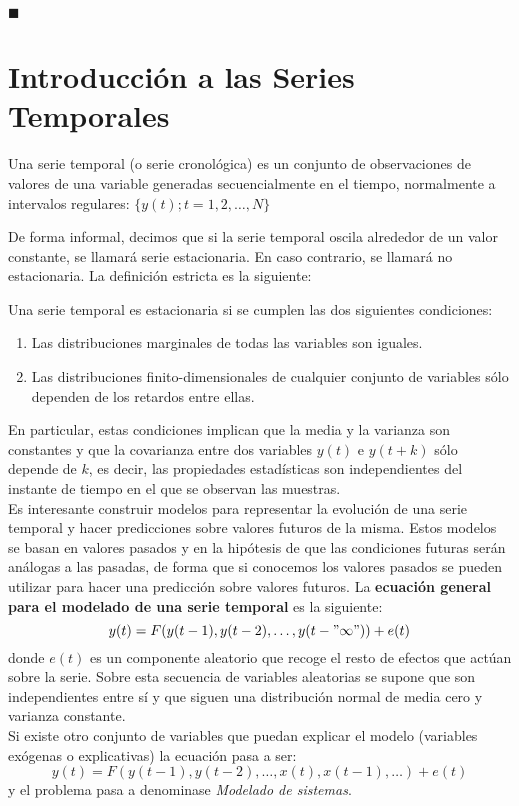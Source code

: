\begin{flushright}
$\blacksquare$
\end{flushright}

\section{Introducción a las Series Temporales}

\begin{definicion}
Una serie temporal (o serie cronológica) es un conjunto de observaciones de valores de una variable generadas secuencialmente en el tiempo, normalmente a intervalos regulares: $\{y(t); t=1,2,\dots, N\}$
\end{definicion}

De forma informal, decimos que si la serie temporal oscila alrededor de un valor constante, se llamará serie estacionaria. En caso contrario, se llamará no estacionaria. La definición estricta es la siguiente:
\begin{definicion}
Una serie temporal es estacionaria si se cumplen las dos siguientes condiciones:
\begin{enumerate}
\item Las distribuciones marginales de todas las variables son iguales.
\item Las distribuciones finito-dimensionales de cualquier conjunto de variables sólo dependen de los retardos entre ellas.
\end{enumerate}
\end{definicion}
En particular, estas condiciones implican que la media y la varianza son constantes y que la covarianza entre dos variables $y(t)$ e $y(t+k)$ sólo depende de $k$, es decir, las propiedades estadísticas son independientes del instante de tiempo en el que se observan las muestras.\\


Es interesante construir modelos para representar la evolución de una serie temporal y hacer predicciones sobre valores futuros de la misma. Estos modelos se basan en valores pasados y en la hipótesis de que las condiciones futuras serán análogas a las pasadas, de forma que si conocemos los valores pasados se pueden utilizar para hacer una predicción sobre valores futuros. La \textbf{ecuación general para el modelado de una serie temporal} es la siguiente:
\[	y(t) = F(y(t-1), y(t-2), \dots, y(t-"\infty ")) + e(t)	\]
donde $e(t)$ es un componente aleatorio que recoge el resto de efectos que actúan sobre la serie. Sobre esta secuencia de variables aleatorias se supone que son independientes entre sí y que siguen una distribución normal de media cero y varianza constante.\\
Si existe otro conjunto de variables que puedan explicar el modelo (variables exógenas o explicativas) la ecuación pasa a ser:
\[	y(t) = F(y(t-1), y(t-2), \dots, x(t), x(t-1), \dots) + e(t)	\]
y el problema pasa a denominase \textit{Modelado de sistemas}.\\

